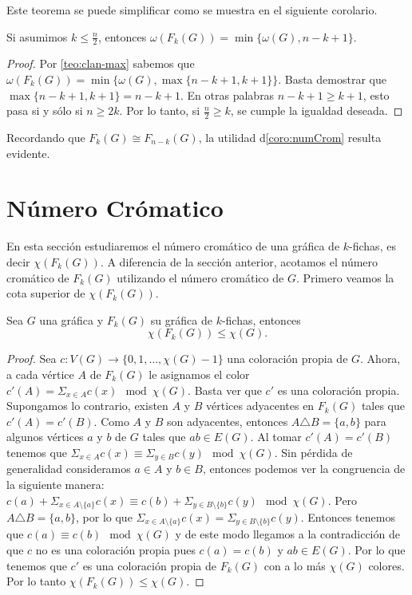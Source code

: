     Este teorema se puede simplificar como se muestra en el siguiente corolario.

    \begin{corolario}
    \label{coro:numCrom}
        Si asumimos $k \leq \frac{n}{2}$, entonces $\omega(F_k(G))= \min
        \{\omega(G), n-k+1\}$.
    \end{corolario}

    \begin{proof}
        Por \cref{teo:clan-max} sabemos que $\omega(F_k(G))= \min
        \{\omega(G), \max \{n-k+1,k+1\}\}$. Basta demostrar que $\max \{n-k+1,
        k+1\} = n-k+1$. En otras palabras $n-k+1 \geq k+1$, esto pasa si y
        s\'olo si $n \geq 2k$. Por lo tanto, si $\frac{n}{2} \geq k$, se cumple
        la igualdad deseada.
    \end{proof}

    Recordando que $F_k(G) \cong F_{n-k}(G)$, la utilidad  d\cref{coro:numCrom}
    resulta evidente.

\section{N\'umero Cr\'omatico}%
\label{sec:num cromatico}

En esta secci\'on estudiaremos el n\'umero crom\'atico de una gr\'afica de
$k$-fichas, es decir $\chi (F_k(G))$. A diferencia de la secci\'on anterior,
acotamos el n\'umero crom\'atico de $F_k(G)$ utilizando el n\'umero crom\'atico
de $G$. Primero veamos la cota superior de $ \chi (F_k(G))$.

\begin{teorema}
\label{teo:num cromatico de G y F(G)}
    Sea $G$ una gr\'afica y $F_k(G)$ su gr\'afica de $k$-fichas, entonces
    \[
        \chi(F_k(G)) \leq \chi (G).
    \]
\end{teorema}

\begin{proof}
    Sea $c: V(G) \to \{0,1, \dots, \chi(G)-1\}$ una coloraci\'on propia de $G$.
    Ahora, a cada v\'ertice $A$ de $F_k(G)$ le asignamos el color $ c'(A)=
    \Sigma_{x \in A}c(x) \mod \chi(G)$. Basta ver que $c'$ es una coloraci\'on
    propia. Supongamos lo contrario, existen $A$ y $B$ v\'ertices adyacentes en
    $F_k(G)$ tales que $c'(A) = c'(B)$. Como $A$ y $B$ son adyacentes, entonces
    $A \triangle B = \{a,b\}$ para algunos v\'ertices $a$ y $b$ de $G$ tales que
    $ab \in E(G)$. Al tomar $c'(A) = c'(B)$ tenemos que $\Sigma_{x \in A}c(x)
    \equiv \Sigma_{y \in B}c(y) \mod \chi(G)$. Sin p\'erdida de generalidad
    consideramos $a \in A$ y $b \in B$, entonces podemos ver la congruencia de
    la siguiente manera: $c(a) + \Sigma_{x \in A \setminus\{a\}}c(x) \equiv c(b)
    + \Sigma_{y \in B\setminus\{b\}}c(y) \mod \chi(G)$. Pero $A \triangle B =
    \{a,b\}$, por lo que $\Sigma_{x \in A\setminus\{a\}}c(x)=\Sigma_{y \in
    B\setminus\{b\}}c(y)$. Entonces tenemos que $c(a) \equiv c(b) \mod \chi(G)$
    y de este modo llegamos a la contradicci\'on de que $c$ no es una
    coloraci\'on propia pues $c(a) = c(b)$ y $ab \in E(G)$. Por lo que tenemos
    que $c'$ es una coloraci\'on propia de $F_k(G)$ con a lo m\'as $\chi (G)$
    colores. Por lo tanto $\chi(F_k(G)) \leq \chi (G)$.
\end{proof}

